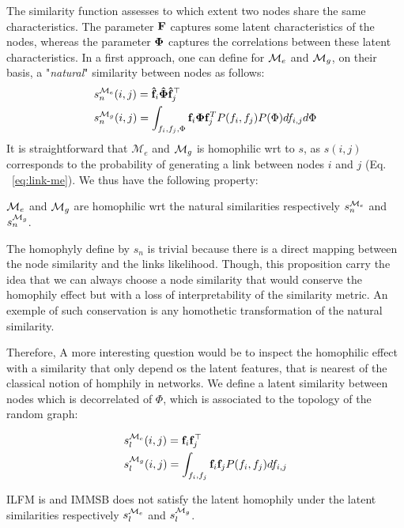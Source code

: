 The similarity function assesses to which extent two nodes share the same characteristics. The parameter $\mathbf{F}$ captures some latent characteristics of the nodes, whereas the parameter $\mathbf{\Phi}$ captures the correlations between these latent characteristics. In a first approach, one can define for $\mathcal{M}_e$ and $\mathcal{M}_g$, on their basis, a "\emph{natural}" similarity between nodes as follows:
%
\begin{align}
&s_n^{\mathcal{M}_e}(i,j) = \mathbf{\hat{f}}_{i} \mathbf{\hat{\Phi}} \mathbf{\hat{f}}_j^\top \nonumber \\
&s_n^{\mathcal{M}_g}(i,j) = \int_{f_i, f_j,\Phi} \mathbf{f}_i\mathbf{\Phi} \mathbf{f}_j^T P(f_i, f_j) P(\Phi) df_{i,j}d\Phi
\end{align}
%
It is straightforward that $\mathcal{M}_e$ and $\mathcal{M}_g$ is homophilic wrt to $s$, as $s(i,j)$ corresponds to the probability of generating a link between nodes $i$ and $j$ (Eq.   ~\ref{eq:link-me}). We thus have the following property:
%
\begin{proposition}[] $\mathcal{M}_e$ and $\mathcal{M}_g$ are homophilic wrt the natural similarities respectively  $s_n^{\mathcal{M}_e}$ and $s_n^{\mathcal{M}_g}$.
\end{proposition}

The homophyly define by $s_n$ is trivial because there is a direct mapping between the node similarity and the links likelihood. Though, this proposition carry the idea that we can always choose a node similarity that would conserve the homophily effect but with a loss of interpretability of the similarity metric. An exemple of such conservation is any homothetic transformation of the natural similarity.

Therefore, A more interesting question would be to inspect the homophilic effect with a similarity that only depend os the latent features, that is nearest of the classical notion of homphily in networks. We define a latent similarity between nodes which is decorrelated of $\Phi$, which is associated to the topology of the random graph:

\begin{align}
&s_l^{\M_e}(i,j) = \mat{f}_{i} \mat{f}_j^\top \nonumber \\
&s_l^{\M_g}(i,j) = \int_{f_i, f_j} \mat{f}_i\mat{f}_j \p(f_i, f_j)  df_{i,j}
\label{eq:latent-sim}
\end{align}


\begin{proposition}[]
	ILFM is and IMMSB does not satisfy the latent homophily under the latent similarities respectively $s_l^{\mathcal{M}_e}$ and $s_l^{\mathcal{M}_g}$.
\end{proposition}

